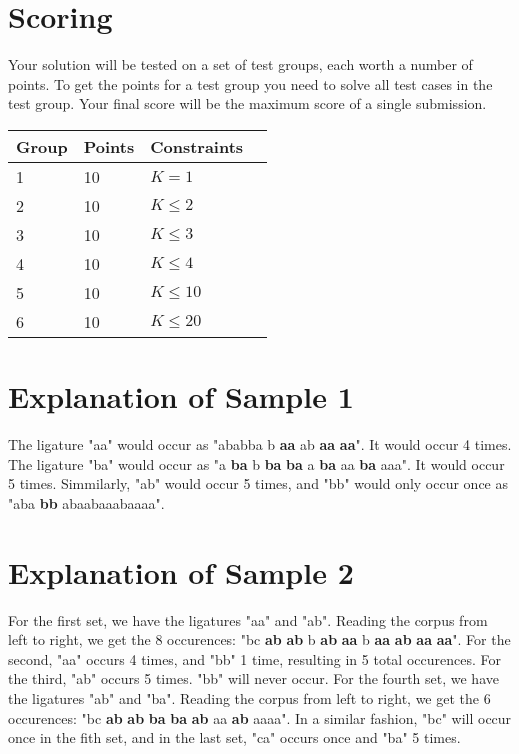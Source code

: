 \section*{Scoring}
Your solution will be tested on a set of test groups, each worth a number of points.
To get the points for a test group you need to solve all test cases in the test group.
Your final score will be the maximum score of a single submission.

\noindent
\begin{tabular}{| l | l | l | l |}
\hline
Group & Points & Constraints \\ \hline
1     & 10     & $K = 1$ \\ \hline
2     & 10     & $K \le 2$ \\ \hline
3     & 10     & $K \le 3$ \\ \hline
4     & 10     & $K \le 4$ \\ \hline
5     & 10     & $K \le 10$ \\ \hline
6     & 10     & $K \le 20$ \\ \hline
\end{tabular}

\section*{Explanation of Sample 1}
The ligature "aa" would occur as "ababba  b \textbf{aa} ab \textbf{aa} \textbf{aa}". It would occur 4 times. 
The ligature "ba" would occur as "a \textbf{ba} b \textbf{ba} \textbf{ba} a \textbf{ba} aa \textbf{ba} aaa". It would occur 5 times. 
Simmilarly, "ab" would occur 5 times, and "bb" would only occur once as "aba \textbf{bb} abaabaaabaaaa".

\section*{Explanation of Sample 2}
For the first set, we have the ligatures "aa" and "ab". Reading the corpus from left to right, we get the 8 occurences: 
"bc \textbf{ab} \textbf{ab} b \textbf{ab} \textbf{aa} b \textbf{aa} \textbf{ab} \textbf{aa} \textbf{aa}".
For the second, "aa" occurs 4 times, and "bb" 1 time, resulting in 5 total occurences.
For the third, "ab" occurs 5 times. "bb" will never occur.
For the fourth set, we have the ligatures "ab" and "ba". Reading the corpus from left to right, we get the 6 occurences: 
"bc \textbf{ab} \textbf{ab} \textbf{ba} \textbf{ba} \textbf{ab} aa \textbf{ab} aaaa".
In a similar fashion, "bc" will occur once in the fith set, and in the last set, "ca" occurs once and "ba" 5 times. 
